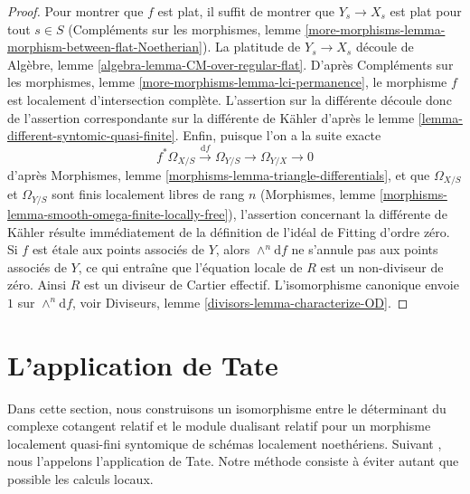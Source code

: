 \begin{proof}
Pour montrer que $f$ est plat, il suffit de montrer que $Y_s \to X_s$
est plat pour tout $s \in S$ (Compléments sur les morphismes, lemme
\ref{more-morphisms-lemma-morphism-between-flat-Noetherian}).
La platitude de $Y_s \to X_s$ découle de
Algèbre, lemme \ref{algebra-lemma-CM-over-regular-flat}.
D'après Compléments sur les morphismes, lemme
\ref{more-morphisms-lemma-lci-permanence},
le morphisme $f$ est localement d'intersection complète.
L'assertion sur la différente découle donc de
l'assertion correspondante sur la différente de Kähler d'après le
lemme \ref{lemma-different-syntomic-quasi-finite}.
Enfin, puisque l'on a la suite exacte
$$
f^*\Omega_{X/S} \xrightarrow{\text{d}f} \Omega_{Y/S} \to \Omega_{Y/X} \to 0
$$
d'après Morphismes, lemme \ref{morphisms-lemma-triangle-differentials},
et que $\Omega_{X/S}$ et $\Omega_{Y/S}$ sont finis localement libres
de rang $n$ (Morphismes, lemme
\ref{morphisms-lemma-smooth-omega-finite-locally-free}),
l'assertion concernant la différente de Kähler résulte immédiatement de la définition
de l'idéal de Fitting d'ordre zéro. Si $f$ est étale aux points associés
de $Y$, alors $\wedge^n\text{d}f$ ne s'annule pas aux
points associés de $Y$, ce qui entraîne que l'équation locale
de $R$ est un non-diviseur de zéro. Ainsi $R$ est un diviseur de Cartier effectif.
L'isomorphisme canonique envoie $1$ sur $\wedge^n\text{d}f$, voir
Diviseurs, lemme \ref{divisors-lemma-characterize-OD}.
\end{proof}






\section{L'application de Tate}
\label{section-tate-map}

\noindent
Dans cette section, nous construisons un isomorphisme entre
le déterminant du complexe cotangent relatif et
le module dualisant relatif pour un morphisme localement quasi-fini
syntomique de schémas localement noethériens. Suivant
\cite[1.4.4]{Garel}, nous l'appelons l'application de Tate.
Notre méthode consiste à éviter autant que possible
les calculs locaux.

